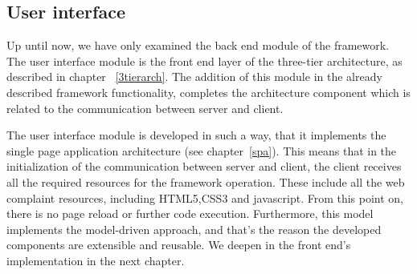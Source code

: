 \subsection{User interface}
Up until now, we have only examined the back end module of the framework. The user interface module is the front end layer of the three-tier architecture, as described in chapter ~\ref{3tierarch}. The addition of this module in the already described framework functionality, completes the architecture component which is related to the communication between server and client. \par
	The user interface module is developed in such a way, that it implements the single page application architecture (see chapter~\ref{spa}). This means that in the initialization of the communication between server and client, the client receives all the required resources for the framework operation. These include all the web complaint resources, including HTML5,CSS3 and javascript. From this point on, there is no page reload or further code execution. Furthermore, this model implements the model-driven approach, and that's the reason the developed components are extensible and reusable. We deepen in the front end's implementation in the next chapter.


	